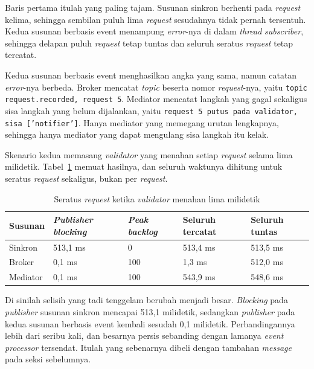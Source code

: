 Baris pertama itulah yang paling tajam. Susunan sinkron berhenti pada
\textit{request} kelima, sehingga sembilan puluh lima \textit{request} sesudahnya tidak
pernah tersentuh. Kedua susunan berbasis event menampung \textit{error}-nya di dalam
\textit{thread} \textit{subscriber}, sehingga delapan puluh \textit{request} tetap tuntas dan
seluruh seratus \textit{request} tetap tercatat.

Kedua susunan berbasis event menghasilkan angka yang sama, namun catatan
\textit{error}-nya berbeda. Broker mencatat \textit{topic} beserta nomor \textit{request}-nya, yaitu
\texttt{topic request.recorded, request 5}. Mediator mencatat langkah yang
gagal sekaligus sisa langkah yang belum dijalankan, yaitu \texttt{request 5
putus pada validator, sisa ['notifier']}. Hanya mediator yang memegang
urutan lengkapnya, sehingga hanya mediator yang dapat mengulang sisa langkah
itu kelak.

Skenario kedua memasang \textit{validator} yang menahan setiap \textit{request} selama lima
milidetik. Tabel~\ref{tab:lambat} memuat hasilnya, dan seluruh waktunya
dihitung untuk seratus \textit{request} sekaligus, bukan per \textit{request}.

\begin{table}[htbp]
  \centering
  \caption{Seratus \textit{request} ketika \textit{validator} menahan lima milidetik}
  \label{tab:lambat}
  \begin{tabularx}{\textwidth}{|l|l|l|l|X|}
    \hline
    \textbf{Susunan} & \textbf{\textit{Publisher blocking}} & \textbf{\textit{Peak backlog}} & \textbf{Seluruh tercatat} & \textbf{Seluruh tuntas} \\
    \hline
    Sinkron & 513,1 ms & 0 & 513,4 ms & 513,5 ms \\
    \hline
    Broker & 0,1 ms & 100 & 1,3 ms & 512,0 ms \\
    \hline
    Mediator & 0,1 ms & 100 & 543,9 ms & 548,6 ms \\
    \hline
  \end{tabularx}
\end{table}

Di sinilah selisih yang tadi tenggelam berubah menjadi besar.
\textit{Blocking} pada
\textit{publisher} susunan sinkron mencapai 513,1 milidetik, sedangkan \textit{publisher} pada kedua susunan
berbasis event kembali sesudah 0,1 milidetik. Perbandingannya lebih dari seribu
kali, dan besarnya persis sebanding dengan lamanya \textit{event processor} tersendat.
Itulah yang sebenarnya dibeli dengan tambahan \textit{message} pada seksi sebelumnya.

